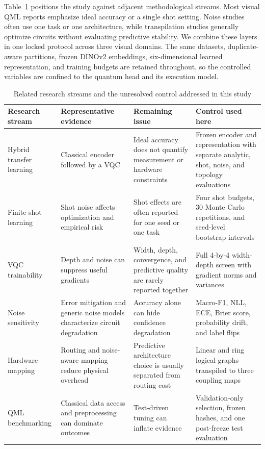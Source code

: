 \documentclass[pdflatex,sn-mathphys-num]{sn-jnl}
\begin{document}
Table~\ref{tab:related} positions the study against adjacent methodological streams. Most visual QML reports emphasize ideal accuracy or a single shot setting. Noise studies often use one task or one architecture, while transpilation studies generally optimize circuits without evaluating predictive stability. We combine these layers in one locked protocol across three visual domains. The same datasets, duplicate-aware partitions, frozen DINOv2 embeddings, six-dimensional learned representation, and training budgets are retained throughout, so the controlled variables are confined to the quantum head and its execution model.

\begin{table}[htbp]
\caption{Related research streams and the unresolved control addressed in this study}\label{tab:related}
\centering
\scriptsize
\setlength{\tabcolsep}{4pt}
\begin{tabularx}{\textwidth}{@{}>{\raggedright\arraybackslash}p{}>{\raggedright\arraybackslash}p{}>{\raggedright\arraybackslash}p{}>{\raggedright\arraybackslash}X@{}}
\toprule
\textbf{Research stream} & \textbf{Representative evidence} & \textbf{Remaining issue} & \textbf{Control used here} \\
\midrule
Hybrid transfer learning & Classical encoder followed by a VQC \cite{MARI-2020,CHEN-2024} & Ideal accuracy does not quantify measurement or hardware constraints & Frozen encoder and representation with separate analytic, shot, noise, and topology evaluations \\
Finite-shot learning & Shot noise affects optimization and empirical risk \cite{KUBLER-2020,SWEKE-2020,CATAK-2026} & Shot effects are often reported for one seed or one task & Four shot budgets, 30 Monte Carlo repetitions, and seed-level bootstrap intervals \\
VQC trainability & Depth and noise can suppress useful gradients \cite{MCCLEAN-2018,WANG-NOISE-2021} & Width, depth, convergence, and predictive quality are rarely reported together & Full 4-by-4 width-depth screen with gradient norms and variances \\
Noise sensitivity & Error mitigation and generic noise models characterize circuit degradation \cite{TEMME-2017,ENDO-2021,JATTANA-2020} & Accuracy alone can hide confidence degradation & Macro-F1, NLL, ECE, Brier score, probability drift, and label flips \\
Hardware mapping & Routing and noise-aware mapping reduce physical overhead \cite{LI-2019,MURALI-2019,HASHIM-2021} & Predictive architecture choice is usually separated from routing cost & Linear and ring logical graphs transpiled to three coupling maps \\
QML benchmarking & Classical data access and preprocessing can dominate outcomes \cite{HUANG-2021,THANASILP-2024,ODAGIU-2025} & Test-driven tuning can inflate evidence & Validation-only selection, frozen hashes, and one post-freeze test evaluation \\
\bottomrule
\end{tabularx}
\end{table}
\end{document}
